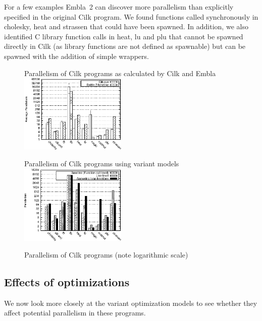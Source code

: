 For a few examples Embla~2 can discover more parallelism than explicitly specified in the original Cilk program.
We found functions called synchronously in \textsf{cholesky}, \textsf{heat} and \textsf{strassen} that could have been spawned.
In addition, we also identified C library function calls in \textsf{heat},
\textsf{lu} and \textsf{plu} that cannot be spawned directly in Cilk (as library functions are not defined as spawnable) but can be spawned with the addition of simple wrappers.

\begin{figure}[t]
 \begin{center}
  \begin{SubFloat}{\label{cilk-run}Parallelism of Cilk programs as calculated by Cilk and Embla}
   \includegraphics[width=2.0in]{cilk-run}
  \end{SubFloat}
 \qquad
  \begin{SubFloat}{\label{cilk-gran-loop}Parallelism of Cilk programs using variant models}
   \includegraphics[width=2.0in]{cilk-gran-loop}
  \end{SubFloat}
 \end{center}
 \caption{Parallelism of Cilk programs (note logarithmic scale)}
\end{figure}

\subsection{Effects of optimizations} \label{sresults:cilk-opts}

We now look more closely at the variant optimization models to see whether they affect potential parallelism in these programs.

